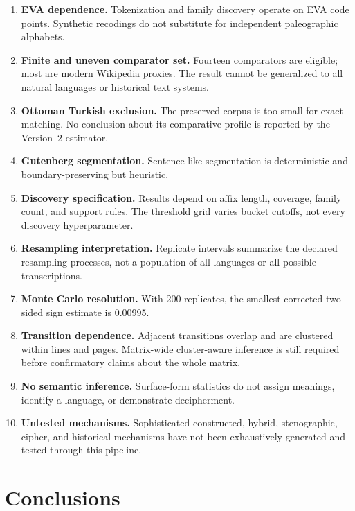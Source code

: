 \documentclass[11pt]{article}
\begin{document}
\begin{enumerate}
  \item \textbf{EVA dependence.} Tokenization and family discovery operate on
        EVA code points. Synthetic recodings do not substitute for independent
        paleographic alphabets.
  \item \textbf{Finite and uneven comparator set.} Fourteen comparators are
        eligible; most are modern Wikipedia proxies. The result cannot be
        generalized to all natural languages or historical text systems.
  \item \textbf{Ottoman Turkish exclusion.} The preserved corpus is too small
        for exact matching. No conclusion about its comparative profile is
        reported by the Version~2 estimator.
  \item \textbf{Gutenberg segmentation.} Sentence-like segmentation is
        deterministic and boundary-preserving but heuristic.
  \item \textbf{Discovery specification.} Results depend on affix length,
        coverage, family count, and support rules. The threshold grid varies
        bucket cutoffs, not every discovery hyperparameter.
  \item \textbf{Resampling interpretation.} Replicate intervals summarize the
        declared resampling processes, not a population of all languages or
        all possible transcriptions.
  \item \textbf{Monte Carlo resolution.} With 200 replicates, the smallest
        corrected two-sided sign estimate is 0.00995.
  \item \textbf{Transition dependence.} Adjacent transitions overlap and are
        clustered within lines and pages. Matrix-wide cluster-aware inference
        is still required before confirmatory claims about the whole matrix.
  \item \textbf{No semantic inference.} Surface-form statistics do not assign
        meanings, identify a language, or demonstrate decipherment.
  \item \textbf{Untested mechanisms.} Sophisticated constructed, hybrid,
        stenographic, cipher, and historical mechanisms have not been
        exhaustively generated and tested through this pipeline.
\end{enumerate}

\section{Conclusions}
\end{document}
